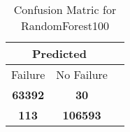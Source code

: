 \begin{table}[] 
\caption{Confusion Matric for RandomForest100} 
\label{Table: Prediction Accuracy-LOFRandomForest100100.0EKF-ignoresolarPanelDipole-solarPanelDipole} 
\centering 
\begin{tabular} 
 {@{}ccc@{}} 
\toprule 
\multicolumn{2}{c}{\textbf{Predicted}}
 \\ \midrule 
\multicolumn{1}{|c|}{Failure} & 
\multicolumn{1}{c|}{No Failure}
 \\ \midrule 
\multicolumn{1}{|c|}{\color{green}\textbf{63392}} & 
\multicolumn{1}{c|}{\color{red}\textbf{30}}
 \\ \midrule 
\multicolumn{1}{|c|}{\color{red}\textbf{113}} & 
\multicolumn{1}{c|}{\color{green}\textbf{106593}}
 \\ \bottomrule 
\end{tabular} 
\end{table} 
